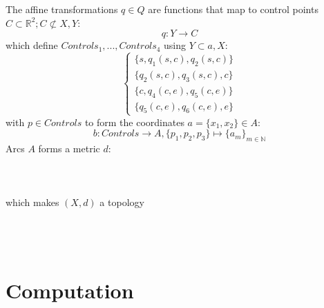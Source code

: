 \documentclass{article}
\begin{document}
The affine transformations $q \in Q$ are functions that map to control points $C \subset \mathbb{R}^2; C \not\subset X,Y$:
\begin{equation}
q: Y \rightarrow C
\end{equation}
which define $Controls_{1}, ... , Controls_{4}$ using $Y \subset a, X$:
\begin{equation}
\begin{cases}
\{s,q_{1}(s,c),q_{2}(s,c)\}\\
\{q_{2}(s,c),q_{3}(s,c),c\}\\
\{c,q_{4}(c,e),q_{5}(c,e)\}\\
\{q_{5}(c,e),q_{6}(c,e),e\}
\end{cases}
\end{equation}
with $p \in Controls$ to form the coordinates $a=\{x_{1},x_{2}\} \in A$:
\begin{equation}
b: Controls \rightarrow A, \{p_{1},p_{2},p_{3}\} \mapsto \{a_{m}\}_{m \in \mathbb{N}}
\end{equation}
Arcs $A$ forms a metric $d$:\\\\\\\\
which makes $(X,d)$ a topology\\\\\\\\

\section{Computation}

\iffalse
\begin{equation} 
\forall u,v \in V :
d(u,v) = 
\begin{cases}
0,  u=v \\
1,  u \neq v 
\end{cases}
\end{equation}
\fi
\end{document}
